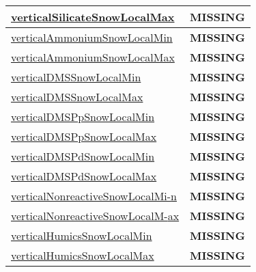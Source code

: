 {\begin{center}
\begin{longtable}{| p{2.0in} | p{4.0in} |}
    \hyperref[subsec:var_sec_tracer_monotonicity_verticalSilicateSnowLocalMax]{verticalSilicateSnowLocalMax} & {\bf \color{red} MISSING} \\
    \hline
    \hyperref[subsec:var_sec_tracer_monotonicity_verticalAmmoniumSnowLocalMin]{verticalAmmoniumSnowLocalMin} & {\bf \color{red} MISSING} \\
    \hline
    \hyperref[subsec:var_sec_tracer_monotonicity_verticalAmmoniumSnowLocalMax]{verticalAmmoniumSnowLocalMax} & {\bf \color{red} MISSING} \\
    \hline
    \hyperref[subsec:var_sec_tracer_monotonicity_verticalDMSSnowLocalMin]{verticalDMSSnowLocalMin} & {\bf \color{red} MISSING} \\
    \hline
    \hyperref[subsec:var_sec_tracer_monotonicity_verticalDMSSnowLocalMax]{verticalDMSSnowLocalMax} & {\bf \color{red} MISSING} \\
    \hline
    \hyperref[subsec:var_sec_tracer_monotonicity_verticalDMSPpSnowLocalMin]{verticalDMSPpSnowLocalMin} & {\bf \color{red} MISSING} \\
    \hline
    \hyperref[subsec:var_sec_tracer_monotonicity_verticalDMSPpSnowLocalMax]{verticalDMSPpSnowLocalMax} & {\bf \color{red} MISSING} \\
    \hline
    \hyperref[subsec:var_sec_tracer_monotonicity_verticalDMSPdSnowLocalMin]{verticalDMSPdSnowLocalMin} & {\bf \color{red} MISSING} \\
    \hline
    \hyperref[subsec:var_sec_tracer_monotonicity_verticalDMSPdSnowLocalMax]{verticalDMSPdSnowLocalMax} & {\bf \color{red} MISSING} \\
    \hline
    \hyperref[subsec:var_sec_tracer_monotonicity_verticalNonreactiveSnowLocalMin]{verticalNonreactiveSnowLocalMi-}\hyperref[subsec:var_sec_tracer_monotonicity_verticalNonreactiveSnowLocalMin]{n  }& {\bf \color{red} MISSING} \\
    \hline
    \hyperref[subsec:var_sec_tracer_monotonicity_verticalNonreactiveSnowLocalMax]{verticalNonreactiveSnowLocalM-}\hyperref[subsec:var_sec_tracer_monotonicity_verticalNonreactiveSnowLocalMax]{ax  }& {\bf \color{red} MISSING} \\
    \hline
    \hyperref[subsec:var_sec_tracer_monotonicity_verticalHumicsSnowLocalMin]{verticalHumicsSnowLocalMin} & {\bf \color{red} MISSING} \\
    \hline
    \hyperref[subsec:var_sec_tracer_monotonicity_verticalHumicsSnowLocalMax]{verticalHumicsSnowLocalMax} & {\bf \color{red} MISSING} \\
    \hline

\end{longtable}
\end{center}}
